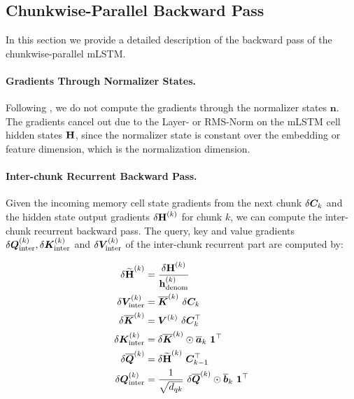 \documentclass{article}
\begin{document}
    \subsection{Chunkwise-Parallel Backward Pass}
    \label{app:chunkwise_parallel_backward_pass}
    In this section we provide a detailed description of the backward pass of the chunkwise-parallel mLSTM.

    \paragraph{Gradients Through Normalizer States.}
    Following \citet{sun:23retentive}, we do not compute the gradients through the normalizer states $\bm{n}$.
    The gradients cancel out due to the Layer- or RMS-Norm on the mLSTM cell hidden states $\bm{\mathrm{H}}$, since the normalizer state is constant over the embedding or feature dimension, which is the normalization dimension.

    \paragraph{Inter-chunk Recurrent Backward Pass.}
    Given the incoming memory cell state gradients from the next chunk $\delta \bm{C}_k$ and the hidden state output gradients $\delta \bm{\mathrm{H}}^{(k)}$ for chunk $k$, we can compute the inter-chunk recurrent backward pass.
    The query, key and value gradients $\delta {\bm{Q}}^{(k)}_\text{inter}, \delta {\bm{K}}^{(k)}_\text{inter}$ and $\delta {\bm{V}}^{(k)}_\text{inter}$ of the inter-chunk recurrent part are computed by:

    \begin{align}
        \delta \widetilde{\bm{\rH}}^{(k)} & = \frac{\delta \bm{\rH}^{(k)}}{\bm{\Rh}^{(k)}_{\text{denom}}}                                \\
        \delta \BV^{(k)}_\text{inter}     & = \overline{\BK}^{(k)} \ \delta \BC_k                                                        \\
        \delta \overline{\BK}^{(k)}       & = \BV^{(k)} \ \delta \BC_k^\top                                                              \\
        \delta \BK^{(k)}_\text{inter}     & = \delta \overline{\BK}^{(k)} \odot \overline{\Ba}_k \ \bm{1}^\top                           \\
        \delta \overline{\BQ}^{(k)}       & = \delta \widetilde{\bm{\rH}}^{(k)} \ \BC_{k-1}^\top                                         \\
        \delta {\BQ}^{(k)}_\text{inter}   & = \frac{1}{\sqrt{d_{qk}}} \ \delta \overline{\BQ}^{(k)} \odot \overline{\Bb}_k \ \bm{1}^\top
    \end{align}
\end{document}
